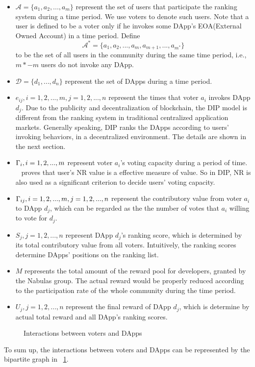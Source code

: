 \begin{itemize}
	\item $\mathcal{A}=\{a_1,a_2,...,a_m\}$ represent the set of users that participate the ranking system during a time period. We use voters to denote such users. Note that a user is defined to be a voter only if he invokes some DApp's EOA(External Owned Account) in a time period. Define $$\mathcal{A}^*=\{a_1,a_2,...,a_m,a_{m+1},...,a_{m^*}\}$$
	to be the set of all users in the community during the same time period, i.e., $m*-m$ users do not invoke any DApp. 	
  \item $\mathcal{D}=\{d_1,...,d_n\}$ represent the set of DApps during a time period.
  \item $e_{ij},i=1,2,...,m, j=1,2,...,n$ represent the times that voter $a_i$ invokes DApp $d_j$. Due to the publicity and decentralization of blockchain, the DIP model is different from the ranking system in traditional centralized application markets. Generally speaking, DIP ranks the DApps according to users' invoking behaviors, in a decentralized environment. The details are shown in the next section.
  
  \item $\Gamma_i, i=1,2,...,m$ represent voter $a_i$'s voting capacity during a period of time.
  ~\cite{Nebulasyellowpaper} proves that user's NR value is a effective measure of value. So in DIP, NR is also used as a significant criterion to decide users' voting capacity.	
  \item $\Gamma_{ij}, i=1,2,...,m,j=1,2,...,n$ represent the contributory value from voter $a_i$ to DApp $d_j$, which can be regarded as the the number of votes that $a_i$ willing to vote for $d_j$.
  
  \item $S_j, j=1,2,...,n$ represent DApp $d_j$'s ranking score, which is determined by its total contributory value from all voters. Intuitively, the ranking scores determine DApps' positions on the ranking list. 
  
  	\item $M$ represents the total amount of the reward pool for developers, granted by the Nabulas group.  The actual reward would be properly reduced according to the participation rate of the whole community during the time period. 
   \item $U_j, j=1,2,...,n$ represent the final reward of DApp $d_j$, which is determine by actual total reward and all DApp's ranking scores. 
 \end{itemize}
   \begin{figure}
   	\centering
   	
   	\caption{Interactions between voters and DApps \label{fig:interact}}
   \end{figure}
  To sum up, the interactions between voters and DApps can be represented by the bipartite graph in ~\ref{fig:interact}.
  

